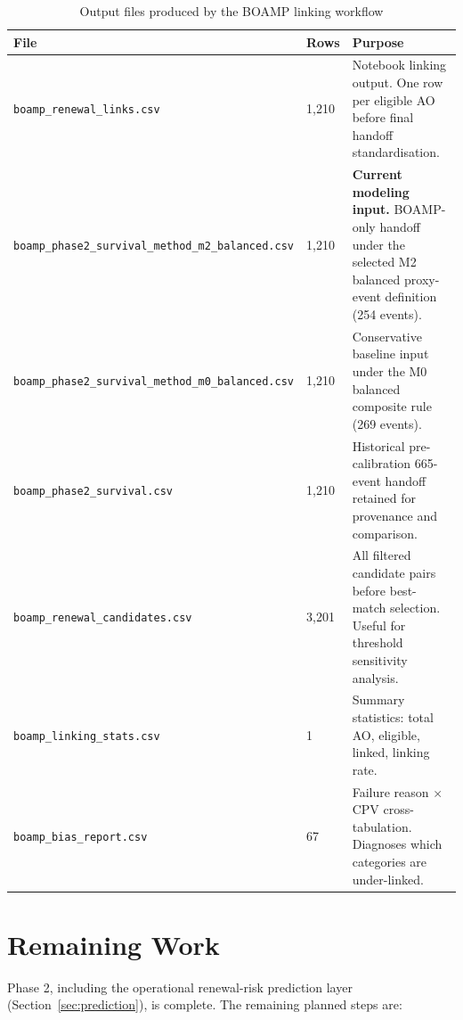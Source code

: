 \documentclass[12pt, a4paper]{article}
\begin{document}
\begin{table}[H]
\centering
\caption{Output files produced by the BOAMP linking workflow}
\small
\begin{tabular}{@{}P{6.4cm}R{1.2cm}P{6.4cm}@{}}
\toprule
File & Rows & Purpose \\
\midrule
\texttt{boamp\_renewal\_links.csv}      & 1,210 & Notebook linking output. One row per eligible AO before final handoff standardisation. \\
\texttt{boamp\_phase2\_survival\_method\_m2\_balanced.csv} & 1,210 & \textbf{Current modeling input.} BOAMP-only handoff under the selected M2 balanced proxy-event definition (254 events). \\
\texttt{boamp\_phase2\_survival\_method\_m0\_balanced.csv} & 1,210 & Conservative baseline input under the M0 balanced composite rule (269 events). \\
\texttt{boamp\_phase2\_survival.csv}    & 1,210 & Historical pre-calibration 665-event handoff retained for provenance and comparison. \\
\texttt{boamp\_renewal\_candidates.csv} & 3,201 & All filtered candidate pairs before best-match selection. Useful for threshold sensitivity analysis. \\
\texttt{boamp\_linking\_stats.csv}      & 1     & Summary statistics: total AO, eligible, linked, linking rate. \\
\texttt{boamp\_bias\_report.csv}        & 67    & Failure reason $\times$ CPV cross-tabulation. Diagnoses which categories are under-linked. \\
\bottomrule
\end{tabular}
\normalsize
\end{table}

\section{Remaining Work}

Phase 2, including the operational renewal-risk prediction layer
(Section~\ref{sec:prediction}), is complete. The remaining planned steps are:
\end{document}
